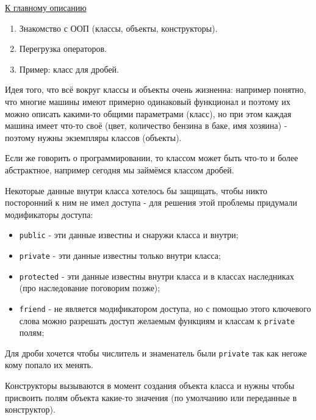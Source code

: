 \label{md2tex1}
\hyperref[md2texREADME]{К главному описанию}


\begin{enumerate}
    \item Знакомство с ООП (классы, объекты, конструкторы).
    \item Перегрузка операторов.
    \item Пример: класс для дробей.
\end{enumerate}


Идея того, что всё вокруг классы и объекты очень жизненна: например понятно, что многие машины имеют примерно одинаковый функционал и поэтому их можно описать какими-то общими параметрами (класс), но при этом каждая машина имеет что-то своё (цвет, количество бензина в баке, имя хозяина) - поэтому нужны экземпляры классов (объекты).

Если же говорить о программировании, то классом может быть что-то и более абстрактное, например сегодня мы займёмся классом дробей.


Некоторые данные внутри класса хотелось бы защищать, чтобы никто посторонний к ним не имел доступа - для решения этой проблемы придумали модификаторы доступа:
\begin{itemize}
    \item \texttt{public} - эти данные известны и снаружи класса и внутри;
    \item \texttt{private} - эти данные известны только внутри класса;
    \item \texttt{protected} - эти данные известны внутри класса и в классах наследниках (про наследование поговорим позже);
    \item \texttt{friend} - не является модификатором доступа, но с помощью этого ключевого слова можно разрешать доступ желаемым функциям и классам к \texttt{private} полям;
\end{itemize}

Для дроби хочется чтобы числитель и знаменатель были \texttt{private} так как негоже кому попало их менять.


Конструкторы вызываются в момент создания объекта класса и нужны чтобы присвоить полям объекта какие-то значения (по умолчанию или переданные в конструктор).


